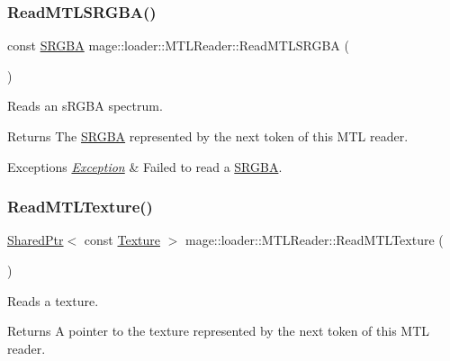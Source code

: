 \subsubsection{\texorpdfstring{Read\+M\+T\+L\+S\+R\+G\+B\+A()}{ReadMTLSRGBA()}}
{\footnotesize\ttfamily const \hyperlink{structmage_1_1_s_r_g_b_a}{S\+R\+G\+BA} mage\+::loader\+::\+M\+T\+L\+Reader\+::\+Read\+M\+T\+L\+S\+R\+G\+BA (\begin{DoxyParamCaption}{ }\end{DoxyParamCaption})\hspace{0.3cm}{\ttfamily [private]}}

Reads an s\+R\+G\+BA spectrum.

\begin{DoxyReturn}{Returns}
The {\ttfamily \hyperlink{structmage_1_1_s_r_g_b_a}{S\+R\+G\+BA}} represented by the next token of this M\+TL reader. 
\end{DoxyReturn}

\begin{DoxyExceptions}{Exceptions}
{\em \hyperlink{classmage_1_1_exception}{Exception}} & Failed to read a {\ttfamily \hyperlink{structmage_1_1_s_r_g_b_a}{S\+R\+G\+BA}}. \\
\hline
\end{DoxyExceptions}
\hypertarget{classmage_1_1loader_1_1_m_t_l_reader_a84404b76b7378dd3fa3fa101ee6265a9}{}\label{classmage_1_1loader_1_1_m_t_l_reader_a84404b76b7378dd3fa3fa101ee6265a9} 
\subsubsection{\texorpdfstring{Read\+M\+T\+L\+Texture()}{ReadMTLTexture()}}
{\footnotesize\ttfamily \hyperlink{namespacemage_a1e01ae66713838a7a67d30e44c67703e}{Shared\+Ptr}$<$ const \hyperlink{classmage_1_1_texture}{Texture} $>$ mage\+::loader\+::\+M\+T\+L\+Reader\+::\+Read\+M\+T\+L\+Texture (\begin{DoxyParamCaption}{ }\end{DoxyParamCaption})\hspace{0.3cm}{\ttfamily [private]}}

Reads a texture.

\begin{DoxyReturn}{Returns}
A pointer to the texture represented by the next token of this M\+TL reader. 
\end{DoxyReturn}

